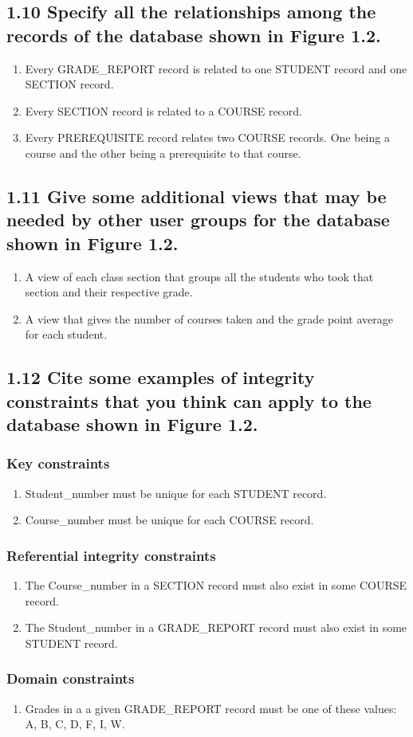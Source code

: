 \subsection*{1.10 Specify all the relationships among the records of the database shown in Figure 1.2.}
\begin{enumerate}
\item Every GRADE\_REPORT record is related to one STUDENT record and one SECTION record.
\item Every SECTION record is related to a COURSE record.
\item Every PREREQUISITE record relates two COURSE records. One being a course and the other being a prerequisite to that course.
\end{enumerate}

\subsection*{1.11 Give some additional views that may be needed by other user groups for the database shown in Figure 1.2.}
\begin{enumerate}
\item A view of each class section that groups all the students who took that section and their respective grade.
\item A view that gives the number of courses taken and the grade point average for each student.
\end{enumerate}

\subsection*{1.12 Cite some examples of integrity constraints that you think can apply to the database shown in Figure 1.2.}
\subsubsection*{Key constraints}
\begin{enumerate}
\item Student\_number must be unique for each STUDENT record.
\item Course\_number must be unique for each COURSE record.
\end{enumerate}

\subsubsection*{Referential integrity constraints}
\begin{enumerate}
\item The Course\_number in a SECTION record must also exist in some COURSE record.
\item The Student\_number in a GRADE\_REPORT record must also exist in some STUDENT record.
\end{enumerate}

\subsubsection*{Domain constraints}
\begin{enumerate}
\item Grades in a a given GRADE\_REPORT record must be one of these values: {A, B, C, D, F, I, W}.
\end{enumerate}
